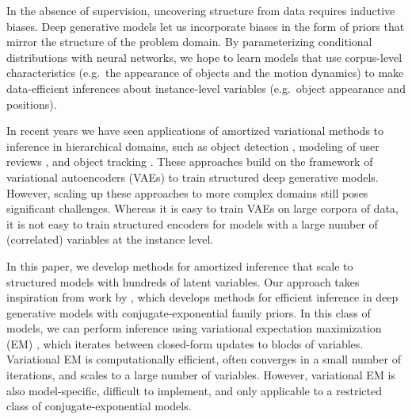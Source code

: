\documentclass{article}
\theoremstyle{definition}
\begin{document}

In the absence of supervision, uncovering structure from data requires inductive biases. Deep generative models let us incorporate biases in the form of priors that mirror the structure of the problem domain. 
By parameterizing conditional distributions with neural networks, we hope to learn models that use corpus-level characteristics (e.g.~the appearance of objects and the motion dynamics) to make data-efficient inferences about instance-level variables (e.g.~object appearance and positions).

In recent years we have seen applications of amortized variational methods to inference in hierarchical domains, such as object detection \cite{eslami2016attend}, modeling of user reviews \cite{esmaeili2019structured}, and object tracking \cite{kosiorek2018sequential}. These approaches build on the framework of variational autoencoders (VAEs) \cite{kingma2013auto-encoding, rezende2014stochastic} to train structured deep generative models. However, scaling up these approaches to more complex domains still poses significant challenges. Whereas it is easy to train VAEs on large corpora of data, it is not easy to train structured encoders for models with a large number of (correlated) variables at the instance level. 

In this paper, we develop methods for amortized inference that scale to structured models with hundreds of latent variables. Our approach takes inspiration from work by \citet{johnson2016composing}, which develops methods for efficient inference in deep generative models with conjugate-exponential family priors. In this class of models, we can perform inference using variational expectation maximization (EM)  \cite{beal2003variational,bishop2006pattern,wainwright2008graphical}, which iterates between closed-form updates to blocks of variables. Variational EM is computationally efficient, often converges in a small number of iterations, and scales to a large number of variables. However, variational EM is also model-specific, difficult to implement, and only applicable to a restricted class of conjugate-exponential models.
\end{document}
